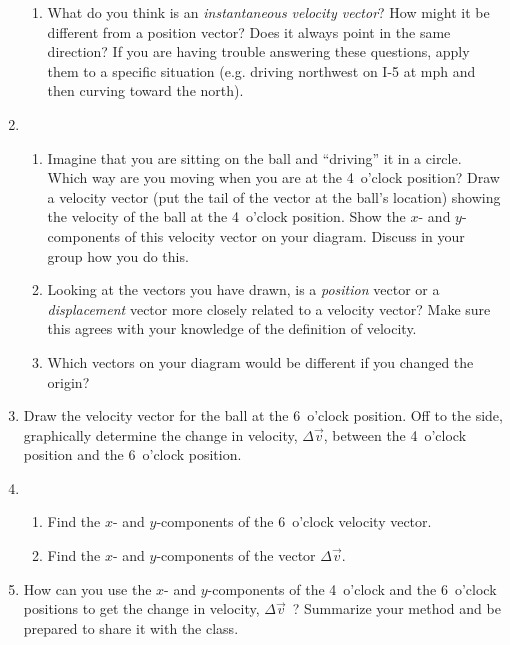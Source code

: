 \begin{enumerate}
\begin{enumerate}
		\item What do you think is an \emph{instantaneous velocity vector}?  How might it be different from a position vector?  Does it always point in the same direction? If you are having trouble answering these questions, apply them to a specific situation (e.g. driving northwest on I-5 at \unit[65]{mph} and then curving toward the north).
	\end{enumerate}
	
	\item \begin{enumerate}
		\item Imagine that you are sitting on the ball and ``driving'' it in a circle. Which way are you moving when you are at the 4~o'clock position?  Draw a velocity vector (put the tail of the vector at the ball's location) showing the velocity of the ball at the 4~o'clock position. Show the $x$- and $y$-components of this velocity vector on your diagram. Discuss in your group how you do this.
		
		\item  Looking at the vectors you have drawn, is a \emph{position} vector or a \emph{displacement} vector more closely related to a velocity vector? Make sure this agrees with your knowledge of the definition of velocity.
		
		\item Which vectors on your diagram would be different if you changed the origin?
	\end{enumerate}
	
\WCD
	
	\item Draw the velocity vector for the ball at the 6~o'clock position. Off to the side, graphically determine the change in velocity, $\Delta \vec{v}$, between the 4~o'clock position and the 6~o'clock position.
	
	\item \begin{enumerate}
		\item Find the $x$- and $y$-components of the 6~o'clock velocity vector.
		
		\item Find the $x$- and $y$-components of the vector $\Delta \vec{v}$.
		
	\end{enumerate}
	
	\item How can you use the $x$- and $y$-components of the 4~o'clock and the 6~o'clock positions to get the change in velocity, $\Delta \vec{v}$~?  Summarize your method and be prepared to share it with the class.
\end{enumerate}

\WCD
